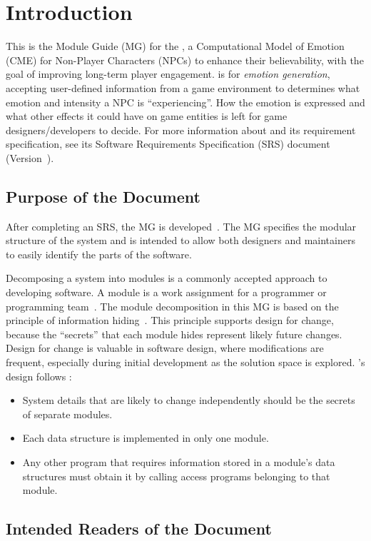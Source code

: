 \section{Introduction}
This is the Module Guide (MG) for the \progname{}, a Computational Model of
Emotion (CME) for Non-Player Characters (NPCs) to enhance their believability,
with the goal of improving long-term player engagement. \progname{} is for
\textit{emotion generation}, accepting user-defined information from a game
environment to determines what emotion and intensity a NPC is ``experiencing''.
How the emotion is expressed and what other effects it could have on game
entities is left for game designers/developers to decide. For more information
about \progname{} and its requirement specification, see its Software
Requirements Specification (SRS) document (Version~\srsVersion).

\subsection{Purpose of the Document}
After completing an SRS, the MG is developed~\citep{ParnasEtAl1984}. The MG
specifies the modular structure of the system and is intended to allow both
designers and maintainers to easily identify the parts of the software.

Decomposing a system into modules is a commonly accepted approach to developing
software.  A module is a work assignment for a programmer or programming
team~\citep{ParnasEtAl1984}. The module decomposition in this MG is based on
the principle of information hiding~\citep{Parnas1972a}. This principle
supports design for change, because the ``secrets'' that each module hides
represent likely future changes. Design for change is valuable in software
design, where modifications are frequent, especially during initial development
as the solution space is explored. \progname{}'s design follows
\citet{ParnasEtAl1984}:
\begin{itemize}
    \item System details that are likely to change independently should be the
    secrets of separate modules.
    \item Each data structure is implemented in only one module.
    \item Any other program that requires information stored in a module's data
    structures must obtain it by calling access programs belonging to that
    module.
\end{itemize}

\subsection{Intended Readers of the Document}

